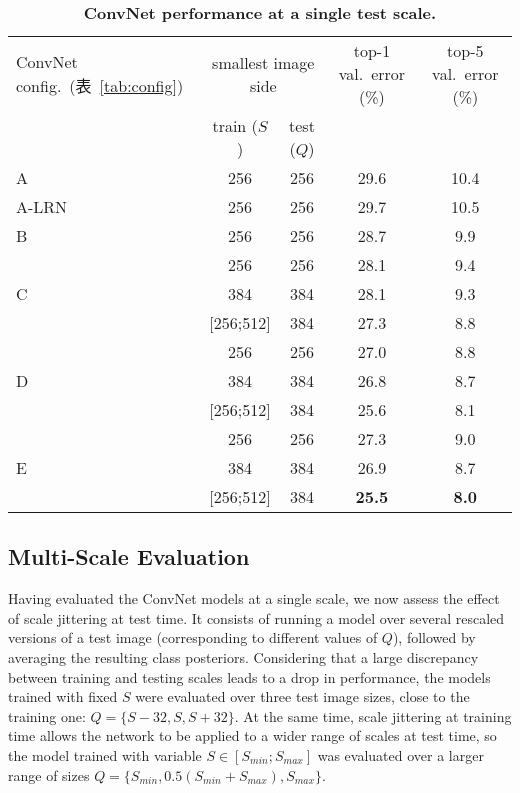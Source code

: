 \documentclass{article} %
\newcommand{\tblref}[1]{表~\ref{#1}}
\begin{document}
\begin{table}[htb]
\small
\centering
\caption{\textbf{ConvNet performance at a single test scale.}
}
\begin{tabular}{|l|c|c|c|c|} \hline
ConvNet config.\ (\tblref{tab:config}) & \multicolumn{2}{c|}{smallest image side} & top-1 val.\ error (\%) & top-5 val.\ error (\%) \\ \cline{2-3}
& train ($S$) & test ($Q$) & & \\ \hline
A & 256 & 256 & 29.6 & 10.4  \\ \hline
A-LRN & 256 & 256 & 29.7 & 10.5  \\ \hline
B & 256 & 256 & 28.7 & 9.9  \\ \hline
\multirow{3}{*}{C} & 256 & 256 & 28.1 & 9.4  \\ \cline{2-5}
 & 384 & 384 & 28.1 & 9.3  \\ \cline{2-5}
 & [256;512] & 384 & 27.3  & 8.8  \\ \hline
 \multirow{3}{*}{D} & 256 & 256 & 27.0  & 8.8  \\ \cline{2-5}
 & 384 & 384 & 26.8  & 8.7  \\ \cline{2-5}
 & [256;512] & 384 & 25.6  & 8.1  \\ \hline
 \multirow{3}{*}{E} & 256 & 256 & 27.3  & 9.0  \\ \cline{2-5}
 & 384 & 384 & 26.9  & 8.7  \\ \cline{2-5}
 & [256;512] & 384 & \textbf{25.5}  & \textbf{8.0}  \\ \hline
\end{tabular}
\label{tab:results_single_scale}
\end{table}

\subsection{Multi-Scale Evaluation}
\label{sec:multi-scale}

Having evaluated the ConvNet models at a single scale, we now assess the effect of scale jittering at test time.
It consists of running a model over several rescaled versions of a test image (corresponding to different values of $Q$), followed by averaging the resulting class posteriors.
Considering that a large discrepancy between training and testing scales leads to a drop in performance, the models trained with fixed $S$ were evaluated over 
three test image sizes, close to the training one: $Q=\{S-32, S, S+32\}$. 
At the same time, scale jittering at training time allows the network to be applied to a wider range of scales at test time, so the model trained
with variable $S \in [S_{min}; S_{max}]$ was evaluated over a larger range of sizes $Q=\{S_{min}, 0.5(S_{min} + S_{max}), S_{max}\}$. 
\end{document}
